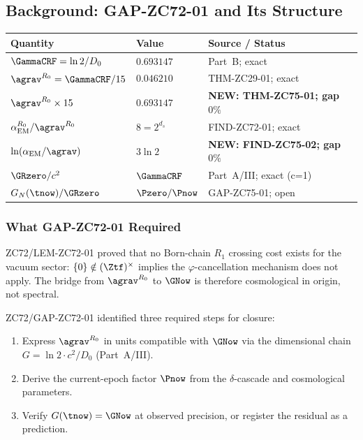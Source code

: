 \documentclass[12pt, a4paper]{article}
\renewcommand{\aEM}{\alpha_{\rm EM}}
\begin{document}
\tableofcontents
\newpage

\subsection{Background: GAP-ZC72-01 and Its Structure}
\label{sec:background}

\begin{keybox}[title={Numerical Summary --- ZC75 (T-canonical, $D_0 = 1$ nat.\ units)}]
{\small\renewcommand{\arraystretch}{1.25}
\begin{center}
\begin{tabular}{@{}p{5.5cm}p{2.2cm}p{4.3cm}@{}}
\toprule
\textbf{Quantity} & \textbf{Value} & \textbf{Source / Status} \\
\midrule
$\GammaCRF = \ln 2/D_0$        & $0.693147$ & Part~B; exact \\
$\agrav^{R_0} = \GammaCRF/15$  & $0.046210$ & THM-ZC29-01; exact \\
$\agrav^{R_0} \times 15$       & $0.693147$ & \textbf{NEW: THM-ZC75-01; gap~$0\%$} \\
$\aEM^{R_0}/\agrav^{R_0}$      & $8 = 2^{d_s}$ & FIND-ZC72-01; exact \\
$\ln(\aEM/\agrav)$             & $3\ln 2$   & \textbf{NEW: FIND-ZC75-02; gap~$0\%$} \\
$\GRzero/c^2$                  & $\GammaCRF$ & Part~A/III; exact (c=1) \\
$G_N(\tnow)/\GRzero$           & $\Pzero/\Pnow$ & GAP-ZC75-01; open \\
\bottomrule
\end{tabular}
\end{center}}
\end{keybox}

\subsubsection{What GAP-ZC72-01 Required}

ZC72/LEM-ZC72-01 proved that no Born-chain $R_1$ crossing cost exists
for the vacuum sector: $\{0\} \notin (\Ztf)^\times$ implies the
$\varphi$-cancellation mechanism does not apply.
The bridge from $\agrav^{R_0}$ to $\GNow$ is therefore cosmological
in origin, not spectral.

ZC72/GAP-ZC72-01 identified three required steps for closure:
\begin{enumerate}[leftmargin=2em, noitemsep]
  \item Express $\agrav^{R_0}$ in units compatible with $\GNow$
    via the dimensional chain $G = \ln2 \cdot c^2/D_0$ (Part~A/III).
  \item Derive the current-epoch factor $\Pnow$ from the $\delta$-cascade
    and cosmological parameters.
  \item Verify $G(\tnow) = \GNow$ at observed precision, or register
    the residual as a prediction.
\end{enumerate}
\end{document}
